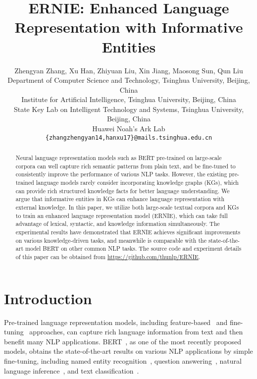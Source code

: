 \documentclass[11pt,a4paper]{article}
\title{ERNIE: Enhanced Language Representation with Informative Entities}
\author{Zhengyan Zhang, Xu Han, Zhiyuan Liu, Xin Jiang, Maosong Sun, Qun Liu \\
        Department of Computer Science and Technology, Tsinghua University, Beijing, China  \\
         Institute for Artificial Intelligence, Tsinghua University, Beijing, China \\ 
         State Key Lab on Intelligent Technology and Systems, Tsinghua University, Beijing, China\\
         Huawei Noah's Ark Lab \\
         \texttt{\{zhangzhengyan14,hanxu17\}@mails.tsinghua.edu.cn}\\
}
\begin{document}
\maketitle
\begin{abstract}

Neural language representation models such as BERT pre-trained on large-scale corpora can well capture rich semantic patterns from plain text, and be fine-tuned to consistently improve the performance of various NLP tasks. However, the existing pre-trained language models rarely consider incorporating knowledge graphs (KGs), which can provide rich structured knowledge facts for better language understanding. We argue that informative entities in KGs can enhance language representation with external knowledge. In this paper, we utilize both large-scale textual corpora and KGs to train an enhanced language representation model (ERNIE), which can take full advantage of lexical, syntactic, and knowledge information simultaneously. The experimental results have demonstrated that ERNIE achieves significant improvements on various knowledge-driven tasks, and meanwhile is comparable with the state-of-the-art model BERT on other common NLP tasks. The source code and experiment details of this paper can be obtained from \url{https://github.com/thunlp/ERNIE}.

\end{abstract}

\section{Introduction}

{\let\thefootnote\relax{}}
{\let\thefootnote\relax{}}
	

Pre-trained language representation models, including feature-based~\cite{mikolov2013distributed,pennington2014glove,peters2017semi,peters2018deep} and fine-tuning~\cite{dai2015semi,howard2018universal,radford2018improving,devlin2018bert} approaches, can capture rich language information from text and then benefit many NLP applications. BERT~\cite{devlin2018bert}, as one of the most recently proposed models, obtains the state-of-the-art results on various NLP applications by simple fine-tuning, including named entity recognition~\cite{sang2003introduction}, question answering~\cite{rajpurkar2016squad,zellers2018swag}, natural language inference~\cite{bowman2015large}, and text classification~\cite{wang2018glue}. 
\end{document}
